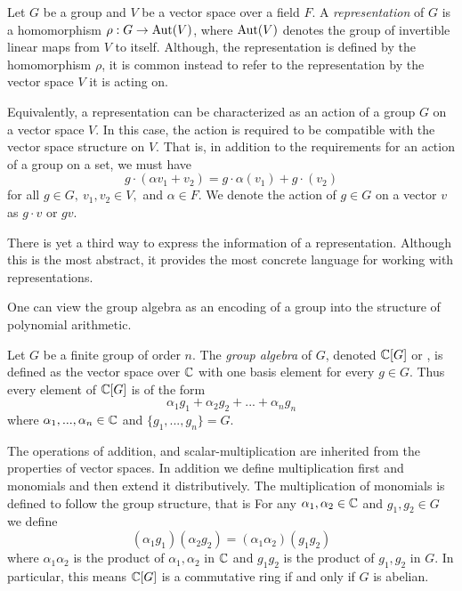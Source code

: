 \begin{definition}
    Let $G$ be a group and $V$ be a vector space over a field $F$. A \emph{representation} of $G$ is a homomorphism 
    $\rho : G \rightarrow \operatorname{Aut}(V)$, where $\operatorname{Aut}(V)$ denotes the group of invertible linear maps from $V$ to itself.  
    Although, the representation is defined by the homomorphism $\rho$, it is common instead to refer to the 
    representation by the vector space $V$ it is acting on.
    
    Equivalently, a representation can be characterized as an action of a group $G$ on a vector space $V$. In this 
    case, the action is required to be compatible with the vector space structure on $V$. That is, in addition to 
    the requirements for an action of a group on a set, we must have
\[g \cdot (\alpha v_1 + v_2) = g\cdot \alpha(v_1) + g\cdot(v_2)\]
    for all $g \in G,\ v_1, v_2 \in V,$ and $\alpha \in F$.
    We denote the action of $g \in G$ on a vector $v$ as $g \cdot v$ or $gv$.
\end{definition}


    There is yet a third way to express the information of a representation. Although this is the most abstract, it 
    provides the most concrete language for working with representations.
    
   
    One can view the group algebra as an encoding of a group into the structure of polynomial arithmetic.


\begin{definition}
    Let $G$ be a finite group of order $n$. The \emph{group algebra} of $G$, denoted $\mathbb{C}[G]$ or \CG, is defined as 
    the vector space over $\mathbb{C}$ with one basis element for every $g \in G$. Thus every element of $\mathbb{C}[G]$ is of the 
    form
    \[
        \alpha_1 g_1 + \alpha_2 g_2 + ... + \alpha_n g_n
    \]
    where $\alpha_1, ..., \alpha_n \in \mathbb{C}$ and $\{g_1, ..., g_n\} = G$.
    
    The operations of addition, and scalar-multiplication are inherited from the properties of vector spaces.  In 
    addition we define multiplication first and monomials and then extend it distributively. The multiplication of 
    monomials is defined to follow the group structure, that is
    For any $\alpha_1, \alpha_2 \in \mathbb{C}$ and $g_1, g_2 \in G$ we define
    \[
        (\alpha_1g_1)(\alpha_2g_2) = (\alpha_1\alpha_2)(g_1g_2)
    \]
    where $\alpha_1\alpha_2$ is the product of $\alpha_1, \alpha_2$ in $\mathbb{C}$ and $g_1 g_2$ is the product of $g_1, 
    g_2$ in $G$. In particular, this means $\mathbb{C}[G]$ is a commutative ring if and only if $G$ is abelian.
\end{definition}

